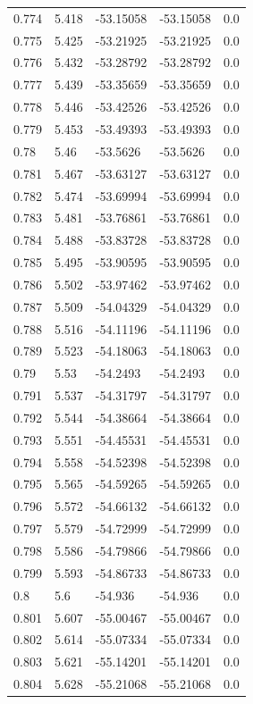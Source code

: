 \begin{tabular}{lllll}
0.774 & 5.418 & -53.15058 & -53.15058 & 0.0 \\
0.775 & 5.425 & -53.21925 & -53.21925 & 0.0 \\
0.776 & 5.432 & -53.28792 & -53.28792 & 0.0 \\
0.777 & 5.439 & -53.35659 & -53.35659 & 0.0 \\
0.778 & 5.446 & -53.42526 & -53.42526 & 0.0 \\
0.779 & 5.453 & -53.49393 & -53.49393 & 0.0 \\
0.78 & 5.46 & -53.5626 & -53.5626 & 0.0 \\
0.781 & 5.467 & -53.63127 & -53.63127 & 0.0 \\
0.782 & 5.474 & -53.69994 & -53.69994 & 0.0 \\
0.783 & 5.481 & -53.76861 & -53.76861 & 0.0 \\
0.784 & 5.488 & -53.83728 & -53.83728 & 0.0 \\
0.785 & 5.495 & -53.90595 & -53.90595 & 0.0 \\
0.786 & 5.502 & -53.97462 & -53.97462 & 0.0 \\
0.787 & 5.509 & -54.04329 & -54.04329 & 0.0 \\
0.788 & 5.516 & -54.11196 & -54.11196 & 0.0 \\
0.789 & 5.523 & -54.18063 & -54.18063 & 0.0 \\
0.79 & 5.53 & -54.2493 & -54.2493 & 0.0 \\
0.791 & 5.537 & -54.31797 & -54.31797 & 0.0 \\
0.792 & 5.544 & -54.38664 & -54.38664 & 0.0 \\
0.793 & 5.551 & -54.45531 & -54.45531 & 0.0 \\
0.794 & 5.558 & -54.52398 & -54.52398 & 0.0 \\
0.795 & 5.565 & -54.59265 & -54.59265 & 0.0 \\
0.796 & 5.572 & -54.66132 & -54.66132 & 0.0 \\
0.797 & 5.579 & -54.72999 & -54.72999 & 0.0 \\
0.798 & 5.586 & -54.79866 & -54.79866 & 0.0 \\
0.799 & 5.593 & -54.86733 & -54.86733 & 0.0 \\
0.8 & 5.6 & -54.936 & -54.936 & 0.0 \\
0.801 & 5.607 & -55.00467 & -55.00467 & 0.0 \\
0.802 & 5.614 & -55.07334 & -55.07334 & 0.0 \\
0.803 & 5.621 & -55.14201 & -55.14201 & 0.0 \\
0.804 & 5.628 & -55.21068 & -55.21068 & 0.0 \\

\end{tabular}
